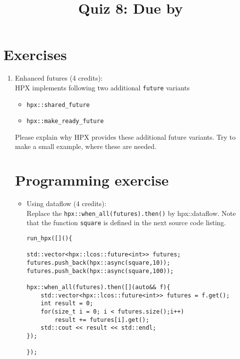 \documentclass[11pt]{article}
\begin{document}
\title{\coursename~Quiz 8: Due by }
\date{}
\maketitle

\medskip


\section*{Exercises}

\begin{enumerate}
\item Enhanced futures (4 credits): \\
HPX implements following two additional \lstinline|future| variants
\begin{itemize}
\item \lstinline|hpx::shared_future|
\item \lstinline|hpx::make_ready_future|
\end{itemize}
Please explain why HPX provides these additional future variants. Try to make a small example, where these are needed.

\section*{Programming exercise}

\begin{itemize}
\item Using dataflow (4 credits): \\
Replace the \lstinline|hpx::when_all(futures).then()| by hpx::dataflow. Note that the function \lstinline|square| is defined in the next source code listing.
\begin{lstlisting}
run_hpx([](){

std::vector<hpx::lcos::future<int>> futures;
futures.push_back(hpx::async(square,10));
futures.push_back(hpx::async(square,100));

hpx::when_all(futures).then([](auto&& f){
    std::vector<hpx::lcos::future<int>> futures = f.get();
    int result = 0;
    for(size_t i = 0; i < futures.size();i++)
        result += futures[i].get();
    std::cout << result << std::endl;
});

});
\end{lstlisting}


\end{itemize}
\end{enumerate}
\end{document}

